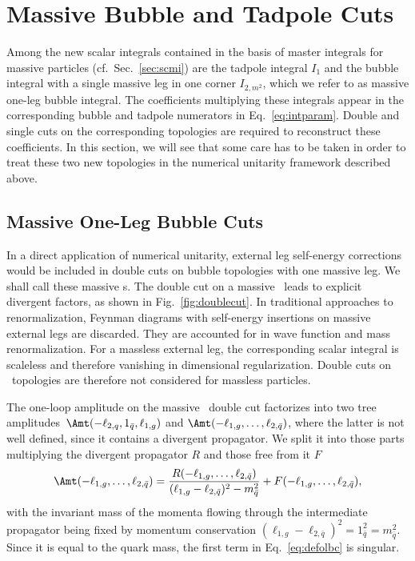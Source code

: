 \section{Massive Bubble and Tadpole Cuts}
\label{sec:massivebubble}
Among the new scalar integrals contained in the basis of master
integrals for massive particles (cf.~Sec.~\ref{sec:scmi}) are the
tadpole integral $I_1$ and the
bubble integral with a single massive leg in one corner $I_{2,m^2}$, which we
refer to as massive one-leg bubble integral. The coefficients
multiplying these integrals appear in the corresponding bubble and tadpole numerators in
Eq.~\eqref{eq:intparam}. Double and
single cuts on the corresponding topologies are required to
reconstruct these coefficients. In this section, we will
see that some care has to
be taken in order to treat these two new topologies
in the numerical unitarity framework described above.

\subsection{Massive One-Leg Bubble Cuts}
\label{sec:1legbub}
In a direct application of numerical unitarity, external
leg self-energy corrections would be included in double cuts on bubble
topologies with one massive leg. We shall call these massive \olb s. The
double cut on a massive \olb~leads to explicit
divergent factors, as shown in Fig.~\ref{fig:doublecut}. In traditional approaches to renormalization, Feynman diagrams with
self-energy insertions on massive external legs are discarded. They
are accounted for in wave function and mass renormalization. For a massless external leg, the
corresponding scalar integral is scaleless and therefore vanishing in
dimensional regularization. Double cuts on \olb~topologies are
therefore not considered for massless particles.


The one-loop amplitude on the massive \olb~double cut factorizes into two tree amplitudes~$\Amt(-\ell_{2,q},1_{\bar
  q},\ell_{1,g})$ and $\Amt(-\ell_{1,g},\dots,\ell_{2,{\bar{q}}})$, where the latter is
not well defined, since it contains a divergent propagator. We split it into those parts multiplying the divergent
propagator $R$ and
those free from it $F$
\begin{align}\label{eq:defolbc}
  \Amt(-\ell_{1,g},\dots,\ell_{2,{\bar{q}}})=\frac{R(-\ell_{1,g},\dots,\ell_{2,{\bar{q}}})}{(\ell_{1,g}-\ell_{2,{\bar{q}}})^2-m^2_{\bar{q}}}+F(-\ell_{1,g},\dots,\ell_{2,\bar{q}}),
\end{align}
with the invariant mass of the momenta flowing through the intermediate
propagator being fixed by momentum conservation
$(\ell_{1,g}-\ell_{2,{\bar{q}}})^2=1_{\bar{q}}^2=m^2_{\bar{q}}$. Since it is equal to the quark mass,
the first term in Eq.~\eqref{eq:defolbc} is singular.



